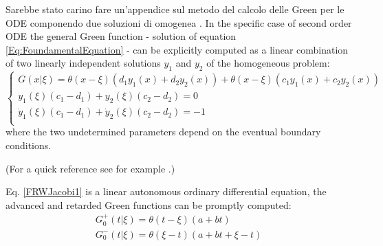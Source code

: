 \documentclass[Main]{subfiles}
\begin{document}
\ifToninus
	\begin{Warning}
		Sarebbe stato carino fare un'appendice sul metodo del calcolo delle Green per le ODE componendo due soluzioni di omogenea \cite{Tornberg}.
		In the specific case of second order ODE the general Green function  - solution of equation \ref{Eq:FoundamentalEquation} - can be explicitly computed as a linear combination of two linearly independent solutions $y_1$ and $y_2$ of the homogeneous problem:
			\begin{equation}
			\begin{cases}
                        G( x \vert \xi) = \theta( x - \xi) \left(d_1 y_1(x) + d_2 y_2(x) \right) + \theta( x - \xi) \left(c_1 y_1(x) + c_2 y_2(x) \right) \\
						y_1(\xi) (c_1-d_1) + y_2(\xi) ( c_2 - d_2) = 0 \\
						\dot{y}_1(\xi) (c_1-d_1) + \dot{y}_2(\xi) ( c_2 - d_2) = -1 \\
            \end{cases}
			\end{equation}
			where the two undetermined parameters depend on the eventual boundary conditions.
		
			(For a quick reference see for example \cite{Tornberg}.)
			
			 Eq. \ref{FRWJacobi1} is a linear autonomous ordinary differential equation, the advanced and retarded Green functions can be promptly computed:
			\begin{eqnarray}\label{SimpleGreenFunction}
				G^+_0(t \vert \xi) = \theta(t-\xi) \left(a +b t \right) \nonumber\\
				G^-_0( t \vert \xi) = \theta(\xi -t) \left( a +b t + \xi -t\right) 
			\end{eqnarray}
	\end{Warning}
\fi
\end{document}
